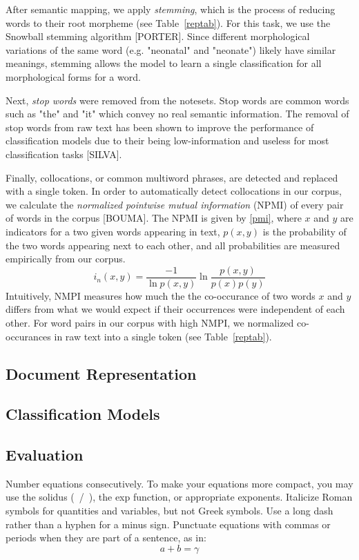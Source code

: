 \documentclass[conference]{IEEEtran}
\begin{document}
After semantic mapping, we apply \textit{stemming}, which is the process of reducing words to their root morpheme (see Table~\ref{reptab}). For this task, we use the Snowball stemming algorithm [PORTER]. Since different morphological variations of the same word (e.g. "neonatal" and "neonate") likely have similar meanings, stemming allows the model to learn  a single classification for all morphological forms for a word.

Next, \textit{stop words} were removed from the notesets. Stop words are common words such as "the" and "it" which convey no real semantic information. The removal of stop words from raw text has been shown to improve the performance of classification models due to their being low-information and useless for most classification tasks [SILVA]. 

Finally, collocations, or common multiword phrases, are detected and replaced with a single token. In order to automatically detect collocations in our corpus, we calculate the \textit{normalized pointwise mutual information} (NPMI) of every pair of words in the corpus [BOUMA]. The NPMI is given by \eqref{pmi}, where $x$ and $y$ are indicators for a two given words appearing in text, $p(x,y)$ is the probability of the two words appearing next to each other, and all probabilities are measured empirically from our corpus.
\begin{equation}
i_n(x,y) = \frac{-1}{\ln p(x,y)}\ln \frac{p(x,y)}{p(x)p(y)}\label{pmi}
\end{equation}
Intuitively, NMPI measures how much the the co-occurance of two words $x$ and $y$ differs from what we would expect if their occurrences were independent of each other. For word pairs in our corpus with high NMPI, we normalized co-occurances in raw text into a single token (see Table~\ref{reptab}).
\subsection{Document Representation}\label{AA}

\subsection{Classification Models}\label{AA}

\subsection{Evaluation}\label{AA}

Number equations consecutively. To make your 
equations more compact, you may use the solidus (~/~), the exp function, or 
appropriate exponents. Italicize Roman symbols for quantities and variables, 
but not Greek symbols. Use a long dash rather than a hyphen for a minus 
sign. Punctuate equations with commas or periods when they are part of a 
sentence, as in:
\begin{equation}
a+b=\gamma\label{eq}
\end{equation}
\end{document}
